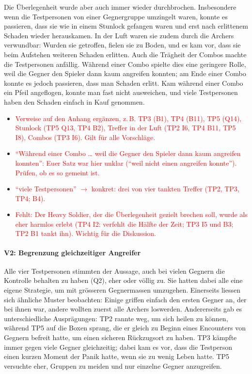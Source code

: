 \documentclass[../Main.tex]{subfiles}
\begin{document}
Die Überlegenheit wurde aber auch immer wieder durchbrochen. Insbesondere wenn die Testpersonen von einer Gegnergruppe umzingelt waren, konnte es passieren, dass sie wie in einem Stunlock gefangen waren und erst nach erlittenem Schaden wieder herauskamen. In der Luft waren sie zudem durch die Archers verwundbar: Wurden sie getroffen, fielen sie zu Boden, und es kam vor, dass sie beim Aufstehen weiteren Schaden erlitten. Auch die Trägheit der Combos machte die Testpersonen anfällig. Während einer Combo spielte dies eine geringere Rolle, weil die Gegner den Spieler dann kaum angreifen konnten; am Ende einer Combo konnte es jedoch passieren, dass man Schaden erlitt. Kam während einer Combo ein Pfeil angeflogen, konnte man fast nicht ausweichen, und viele Testpersonen haben den Schaden einfach in Kauf genommen.

\begin{itemize}[leftmargin=1.5cm]
    \item \textcolor{red}{Verweise auf den Anhang ergänzen, z.\,B. TP3 (B1), TP4 (B11), TP5 (Q14), Stunlock (TP5 Q13, TP4 B2), Treffer in der Luft (TP2 I6, TP4 B11, TP5 I8), Combos (TP3 I6). Gilt für alle Vorschläge.}
    \item \textcolor{red}{\enquote{Während einer Combo \ldots{} weil die Gegner den Spieler dann kaum angreifen konnten}: Euer Satz war hier unklar (\enquote{weil nicht einen angreifen konnte}). Prüfen, ob es so gemeint ist.}
    \item \textcolor{red}{\enquote{viele Testpersonen} $\rightarrow$ konkret: drei von vier tankten Treffer (TP2, TP3, TP4; B4).}
    \item \textcolor{red}{Fehlt: Der Heavy Soldier, der die Überlegenheit gezielt brechen soll, wurde als eher harmlos erlebt (TP4 I2: verfehlt die Hälfte der Zeit; TP3 I5 und B3; TP2 B1 tankt ihn). Wichtig für die Diskussion.}
\end{itemize}

\paragraph{V2: Begrenzung gleichzeitiger Angreifer}
Alle vier Testpersonen stimmten der Aussage, auch bei vielen Gegnern die Kontrolle behalten zu haben (Q2), eher oder völlig zu. Sie hatten dabei alle eine eigene Strategie, um mit grösseren Gegnermassen umzugehen. Einerseits liessen sich ähnliche Muster beobachten: Einige griffen einfach den ersten Gegner an, der bei ihnen war, andere wollten zuerst alle Archers loswerden. Andererseits gab es unterschiedliche Ausprägungen: TP2 rannte weg, um sich heilen zu können, während TP5 auf die Boxen sprang, die er gleich zu Beginn eines Encounters von Gegnern befreit hatte, um einen sicheren Rückzugsort zu haben. TP3 kämpfte immer gegen viele Gegner gleichzeitig; dabei kam es vor, dass die Testperson einen kurzen Moment der Panik hatte, wenn sie zu wenig Leben hatte. TP5 versuchte eher, Gruppen zu meiden und nur einzelne Gegner anzugreifen.
\end{document}
